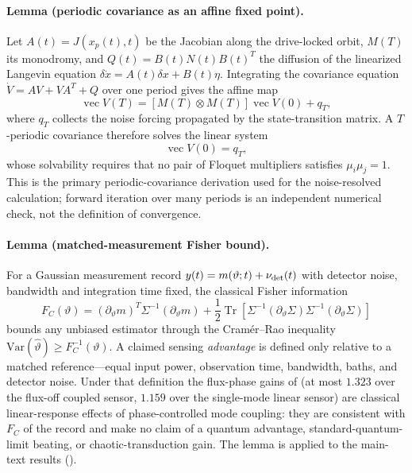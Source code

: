\documentclass[preprint,numbers,a4paper]{elsarticle}
\begin{document}
\paragraph{Lemma (periodic covariance as an affine fixed point).}
Let $A(t)=J(x_p(t),t)$ be the Jacobian along the drive-locked orbit, $M(T)$ its monodromy, and $Q(t)=B(t)N(t)B(t)^T$ the diffusion of the linearized Langevin equation $\delta\dot x=A(t)\delta x+B(t)\eta$. Integrating the covariance equation $\dot V=AV+VA^T+Q$ over one period gives the affine map
\begin{equation}
 \operatorname{vec}V(T)=[M(T)\otimes M(T)]\operatorname{vec}V(0)+q_T,
\label{SI-eq:cov-affine}
\end{equation}
where $q_T$ collects the noise forcing propagated by the state-transition matrix. A $T$-periodic covariance therefore solves the linear system
\begin{equation}
 [I-M(T)\otimes M(T)]\operatorname{vec}V(0)=q_T,
\label{SI-eq:cov-fixed-point}
\end{equation}
whose solvability requires that no pair of Floquet multipliers satisfies $\mu_i\mu_j=1$. This is the primary periodic-covariance derivation used for the noise-resolved calculation; forward iteration over many periods is an independent numerical check, not the definition of convergence.

\paragraph{Lemma (matched-measurement Fisher bound).}
For a Gaussian measurement record $y(t)=m(\vartheta;t)+\nu_{\rm det}(t)$ with detector noise, bandwidth and integration time fixed, the classical Fisher information
\begin{equation}
 F_C(\vartheta)=(\partial_\vartheta m)^T\Sigma^{-1}(\partial_\vartheta m)
 +\frac12\operatorname{Tr}\!\left[\Sigma^{-1}(\partial_\vartheta\Sigma)
 \Sigma^{-1}(\partial_\vartheta\Sigma)\right]
\label{SI-eq:fisher-lemma}
\end{equation}
bounds any unbiased estimator through the Cram\'er--Rao inequality~\cite{clerk2010,braunstein1994} $\mathrm{Var}(\hat\vartheta)\ge F_C^{-1}(\vartheta)$. A claimed sensing \emph{advantage} is defined only relative to a matched reference---equal input power, observation time, bandwidth, baths, and detector noise. Under that definition the flux-phase gains of  (at most $\num{1.323}$ over the flux-off coupled sensor, $\num{1.159}$ over the single-mode linear sensor) are classical linear-response effects of phase-controlled mode coupling: they are consistent with $F_C$ of the record and make no claim of a quantum advantage, standard-quantum-limit beating, or chaotic-transduction gain. The lemma is applied to the main-text results ().
\end{document}
